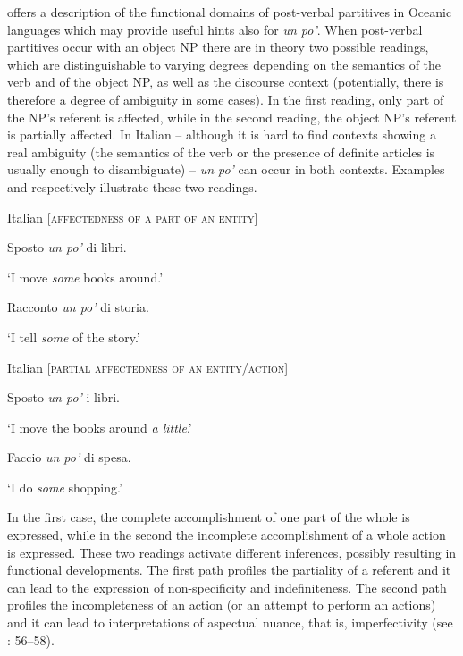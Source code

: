 \citet[240–248]{Budd2014} offers a description of the functional domains of post-verbal partitives in Oceanic languages which may provide useful hints also for \textit{un po’}. When post-verbal partitives occur with an object NP there are in theory two possible readings, which are distinguishable to varying degrees depending on the semantics of the verb and of the object NP, as well as the discourse context (potentially, there is therefore a degree of ambiguity in some cases). In the first reading, only part of the NP’s referent is affected, while in the second reading, the object NP’s referent is partially affected. In Italian – although it is hard to find contexts showing a real ambiguity (the semantics of the verb or the presence of definite articles is usually enough to disambiguate) – \textit{un po’} can occur in both contexts. Examples  and  respectively illustrate these two readings.

\ea%
    \label{ex:key:56}

          Italian \textsc{[affectedness} \textsc{of} \textsc{a} \textsc{part} \textsc{of} \textsc{an} \textsc{entity]}

\ea  Sposto \textit{un po’} di libri.

\glt ‘I move \textit{some} books around.’

\ex Racconto \textit{un po’} di storia.

\glt    ‘I tell \textit{some} of the story.’
\z
\z

\ea%
    \label{ex:key:57}

          Italian \textsc{[partial} \textsc{affectedness} \textsc{of} \textsc{an} \textsc{entity/action]}

\ea Sposto \textit{un po’} i libri.

\glt ‘I move the books around \textit{a little}.’

\ex  Faccio \textit{un po’} di spesa.

\glt ‘I do \textit{some} shopping.’
    \z
    \z

In the first case, the complete accomplishment of one part of the whole is expressed, while in the second the incomplete accomplishment of a whole action is expressed. These two readings activate different inferences, possibly resulting in functional developments. The first path profiles the partiality of a referent and it can lead to the expression of non-specificity and indefiniteness. The second path profiles the incompleteness of an action (or an attempt to perform an actions) and it can lead to interpretations of aspectual nuance, that is, imperfectivity (see \citealt{LuraghiKittilä2014}: 56–58).

